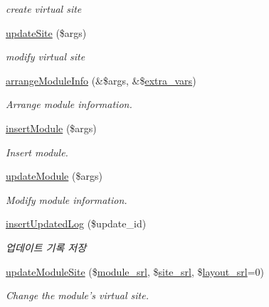 \begin{DoxyCompactItemize}
\begin{DoxyCompactList}\small\item\em create virtual site \end{DoxyCompactList}\item 
\hyperlink{classmoduleController_ae2fb61c8a558f0552202c51d2055eede}{update\-Site} (\$args)
\begin{DoxyCompactList}\small\item\em modify virtual site \end{DoxyCompactList}\item 
\hyperlink{classmoduleController_a4c5f4174ead13e475ea863184bf657d6}{arrange\-Module\-Info} (\&\$args, \&\$\hyperlink{ko_8install_8php_ae1dcb37fc34a8f312d2e6abd6f806743}{extra\-\_\-vars})
\begin{DoxyCompactList}\small\item\em Arrange module information. \end{DoxyCompactList}\item 
\hyperlink{classmoduleController_a8876924470cbfa94679d73dc6fc61332}{insert\-Module} (\$args)
\begin{DoxyCompactList}\small\item\em Insert module. \end{DoxyCompactList}\item 
\hyperlink{classmoduleController_ae4a1e785f41aa56a626b7f72346bbe0c}{update\-Module} (\$args)
\begin{DoxyCompactList}\small\item\em Modify module information. \end{DoxyCompactList}\item 
\hyperlink{classmoduleController_a6edd6c52143fc2f1b818f677dbc54176}{insert\-Updated\-Log} (\$update\-\_\-id)
\begin{DoxyCompactList}\small\item\em 업데이트 기록 저장 \end{DoxyCompactList}\item 
\hyperlink{classmoduleController_a9b1b3b8db4047c33882a9231c5eafb13}{update\-Module\-Site} (\$\hyperlink{ko_8install_8php_a370bb6450fab1da3e0ed9f484a38b761}{module\-\_\-srl}, \$\hyperlink{ko_8install_8php_a8b1406b4ad1048041558dce6bfe89004}{site\-\_\-srl}, \$\hyperlink{ko_8install_8php_a70054876db09b2519a1726663c8dd9e7}{layout\-\_\-srl}=0)
\begin{DoxyCompactList}\small\item\em Change the module's virtual site. \end{DoxyCompactList}\item 

\end{DoxyCompactItemize}
